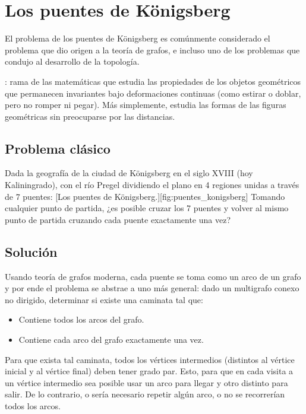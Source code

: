 \section{Los puentes de Königsberg}
\label{sec:los_puentes_de_konigsberg}

El problema de los puentes de Königsberg es comúnmente considerado el problema que dio origen a la teoría de grafos, e incluso uno de los problemas que condujo al desarrollo de la topología.

: rama de las matemáticas que estudia las propiedades de los objetos geométricos que permanecen invariantes bajo deformaciones continuas (como estirar o doblar, pero no romper ni pegar). Más simplemente, estudia las formas de las figuras geométricas sin preocuparse por las distancias.

\subsection{Problema clásico}
\label{sec:problema_clasico}

Dada la geografía de la ciudad de Königsberg en el siglo XVIII (hoy Kaliningrado), con el río Pregel dividiendo el plano en 4 regiones unidas a través de 7 puentes:
[Los puentes de Königsberg.][fig:puentes_konigsberg]
Tomando cualquier punto de partida, ¿es posible cruzar los 7 puentes y volver al mismo punto de partida cruzando cada puente exactamente una vez?

\subsection{Solución}
\label{sec:solucion_moderna}

Usando teoría de grafos moderna, cada puente se toma como un arco de un grafo y por ende el problema se abstrae a uno más general: dado un multigrafo conexo no dirigido, determinar si existe una caminata tal que:
\begin{itemize}
  \item Contiene todos los arcos del grafo.
  \item Contiene cada arco del grafo exactamente una vez.
\end{itemize}

Para que exista tal caminata, todos los  vértices intermedios (distintos al vértice inicial y al vértice final) deben tener grado par. Esto, para que en cada visita a un vértice intermedio sea posible usar un arco para llegar y otro distinto para salir. De lo contrario, o sería necesario repetir algún arco, o no se recorrerían todos los arcos.

